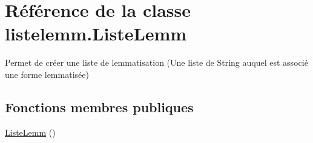 \hypertarget{classlistelemm_1_1_liste_lemm}{}\section{Référence de la classe listelemm.\+Liste\+Lemm}
\label{classlistelemm_1_1_liste_lemm}


Permet de créer une liste de lemmatisation (Une liste de String auquel est associé une forme lemmatisée)  


\subsection*{Fonctions membres publiques}
\begin{DoxyCompactItemize}
\item 
\hyperlink{classlistelemm_1_1_liste_lemm_a6ff6b67fd8529f10d08a47c1ad23febd}{Liste\+Lemm} ()\hypertarget{classlistelemm_1_1_liste_lemm_a6ff6b67fd8529f10d08a47c1ad23febd}{}\label{classlistelemm_1_1_liste_lemm_a6ff6b67fd8529f10d08a47c1ad23febd}


\end{DoxyCompactItemize}
